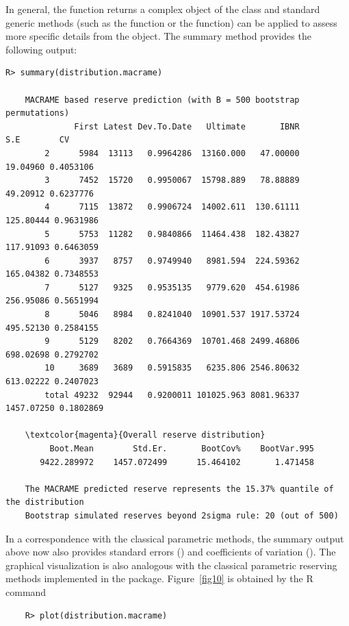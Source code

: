 In general, the  function returns a complex object of the class  and standard  generic methods (such as the  function or the  function) can be applied to assess more specific details from the object. The summary method provides the following output: 

\begin{Verbatim}[commandchars=\\\{\}]
    R> summary(distribution.macrame)

    MACRAME based reserve prediction (with B = 500 bootstrap permutations)
              First Latest Dev.To.Date   Ultimate       IBNR        S.E        CV
        2      5984  13113   0.9964286  13160.000   47.00000   19.04960 0.4053106
        3      7452  15720   0.9950067  15798.889   78.88889   49.20912 0.6237776
        4      7115  13872   0.9906724  14002.611  130.61111  125.80444 0.9631986
        5      5753  11282   0.9840866  11464.438  182.43827  117.91093 0.6463059
        6      3937   8757   0.9749940   8981.594  224.59362  165.04382 0.7348553
        7      5127   9325   0.9535135   9779.620  454.61986  256.95086 0.5651994
        8      5046   8984   0.8241040  10901.537 1917.53724  495.52130 0.2584155
        9      5129   8202   0.7664369  10701.468 2499.46806  698.02698 0.2792702
        10     3689   3689   0.5915835   6235.806 2546.80632  613.02222 0.2407023
        total 49232  92944   0.9200011 101025.963 8081.96337 1457.07250 0.1802869

    \textcolor{magenta}{Overall reserve distribution}
         Boot.Mean        Std.Er.       BootCov%    BootVar.995 
       9422.289972    1457.072499      15.464102       1.471458

    The MACRAME predicted reserve represents the 15.37% quantile of the distribution
    Bootstrap simulated reserves beyond 2sigma rule: 20 (out of 500)
\end{Verbatim}
In a correspondence with the classical parametric methods, the summary output above now also provides standard errors () and coefficients of variation (). The graphical visualization is also  analogous with the classical parametric reserving methods implemented in the  package. Figure~\ref{fig10} is obtained by the R command
\begin{verbatim}
    R> plot(distribution.macrame)
\end{verbatim}

